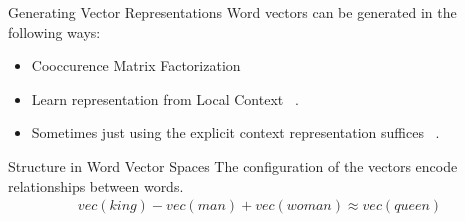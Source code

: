 \begin{frame}{Generating Vector Representations}
  Word vectors can be generated in the following ways:
  \begin{itemize}[<+->]
  \item Cooccurence Matrix Factorization~\cite{Deerwester}
  \item Learn representation from Local Context ~\cite{Mikolov13a}.
  \item Sometimes just using the explicit context representation suffices ~\cite{Levy14}.
  \end{itemize}
\end{frame}

\begin{frame}{Structure in Word Vector Spaces}
  The configuration of the vectors encode relationships between words.
  \begin{align*}
    vec(king) - vec(man) + vec(woman) \approx vec(queen)
  \end{align*}
  \pause
\end{frame}

